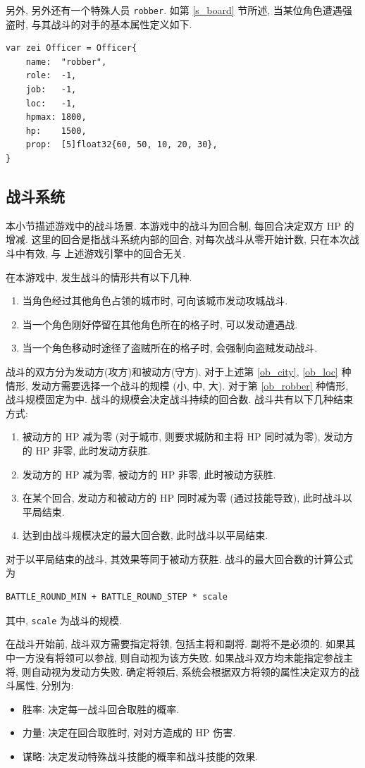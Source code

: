 \documentclass[UTF8, zihao=-4]{ctexart} %
\newcommand{\lcode}{\lstinline} % 段内插入代码
\begin{document}
另外, 另外还有一个特殊人员 \lcode{robber}. 如第 \ref{s_board} 节所述,
当某位角色遭遇强盗时, 与其战斗的对手的基本属性定义如下.
\begin{lstlisting}
var zei Officer = Officer{
	name:  "robber",
	role:  -1,
	job:   -1,
	loc:   -1,
	hpmax: 1800,
	hp:    1500,
	prop:  [5]float32{60, 50, 10, 20, 30},
}
\end{lstlisting}

\subsection{战斗系统}
\label{s_battle}
本小节描述游戏中的战斗场景. 本游戏中的战斗为回合制, 每回合决定双方 HP 的增减.
这里的回合是指战斗系统内部的回合, 对每次战斗从零开始计数, 只在本次战斗中有效, 与
上述游戏引擎中的回合无关. 

在本游戏中, 发生战斗的情形共有以下几种.
\begin{enumerate}
      \item \label{ob_city}当角色经过其他角色占领的城市时, 可向该城市发动攻城战斗.
      \item \label{ob_loc}当一个角色刚好停留在其他角色所在的格子时, 可以发动遭遇战.
      \item \label{ob_robber}当一个角色移动时途径了盗贼所在的格子时, 会强制向盗贼发动战斗.
\end{enumerate}
战斗的双方分为发动方(攻方)和被动方(守方). 对于上述第 \ref{ob_city}, \ref{ob_loc} 种情形, 
发动方需要选择一个战斗的规模 (小, 中, 大). 对于第 \ref{ob_robber} 种情形,
战斗规模固定为中. 战斗的规模会决定战斗持续的回合数. 战斗共有以下几种结束方式:
\begin{enumerate}
      \item 被动方的 HP 减为零 (对于城市, 则要求城防和主将 HP 同时减为零), 发动方的 HP 非零, 此时发动方获胜.
      \item 发动方的 HP 减为零, 被动方的 HP 非零, 此时被动方获胜.
      \item 在某个回合, 发动方和被动方的 HP 同时减为零 (通过技能导致), 此时战斗以平局结束.
      \item 达到由战斗规模决定的最大回合数, 此时战斗以平局结束.
\end{enumerate}
对于以平局结束的战斗, 其效果等同于被动方获胜. 战斗的最大回合数的计算公式为
\begin{lstlisting}
BATTLE_ROUND_MIN + BATTLE_ROUND_STEP * scale
\end{lstlisting}
其中, \lcode{scale} 为战斗的规模.

在战斗开始前, 战斗双方需要指定将领, 包括主将和副将. 副将不是必须的.
如果其中一方没有将领可以参战, 则自动视为该方失败.
如果战斗双方均未能指定参战主将, 则自动视为发动方失败.
确定将领后, 系统会根据双方将领的属性决定双方的战斗属性, 分别为:
\begin{itemize}
      \item 胜率: 决定每一战斗回合取胜的概率.
      \item 力量: 决定在回合取胜时, 对对方造成的 HP 伤害.
      \item 谋略: 决定发动特殊战斗技能的概率和战斗技能的效果.
\end{itemize}
\end{document}
